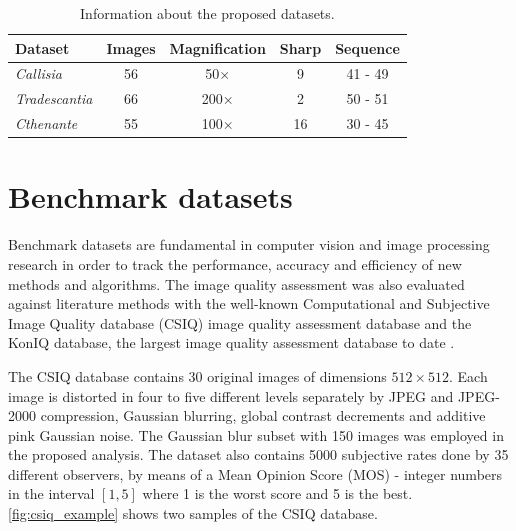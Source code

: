 \begin{table}[ht]
    \centering
    \caption{Information about the proposed datasets.}
    \label{tab:dataset_info}
    \begin{tabular}{lcccc}
        \toprule
        \textbf{Dataset} & \textbf{Images} & \textbf{Magnification} & \textbf{Sharp} & \textbf{Sequence}\\
        \midrule
        \textit{Callisia} & 56 & 50$\times$ & 9 & 41 - 49\\
        \textit{Tradescantia} & 66 & 200$\times$ & 2 & 50 - 51\\
        \textit{Cthenante} & 55 & 100$\times$ & 16 & 30 - 45\\
        \bottomrule
    \end{tabular}
    \centering
    \fautor
\end{table}

\section{Benchmark datasets}

Benchmark datasets are fundamental in computer vision and image processing research in order to track the performance, accuracy and efficiency of new methods and algorithms. The image quality assessment was also evaluated against literature methods with the well-known Computational and Subjective Image Quality database (CSIQ) image quality assessment database \cite{larson2010most} and the KonIQ database, the largest image quality assessment database to date \cite{hosu2020koniq}. 

The CSIQ database contains 30 original images of dimensions $512 \times 512$. Each image is distorted in four to five different levels separately by JPEG and JPEG-2000 compression, Gaussian blurring, global contrast decrements and additive pink Gaussian noise. The Gaussian blur subset with 150 images was employed in the proposed analysis. The dataset also contains 5000 subjective rates done by 35 different observers, by means of a Mean Opinion Score (MOS) - integer numbers in the interval $[1,5]$ where 1 is the worst score and 5 is the best. \autoref{fig:csiq_example} shows two samples of the CSIQ database.

